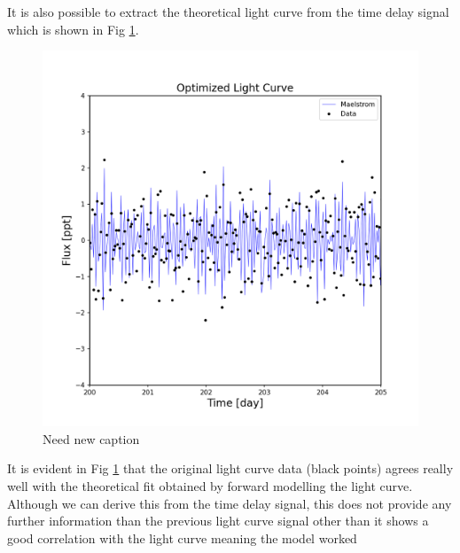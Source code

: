 \documentclass[]{article}
\begin{document}
It is also possible to extract the theoretical light curve from the time delay signal which is shown in Fig \ref{fig:LightcurveOptimized}.
\begin{figure}[H]
    \centering
    \includegraphics[width=1\linewidth]{lightcurve_opt.png}
      \caption{Need new caption}
      \label{fig:LightcurveOptimized}
\end{figure}

It is evident in Fig \ref{fig:LightcurveOptimized} that the original light curve data (black points) agrees really well with the theoretical fit obtained by forward modelling the light curve.
Although we can derive this from the time delay signal, this does not provide any further information than the previous light curve signal other than it shows a good correlation with the light curve meaning the model worked
\end{document}
